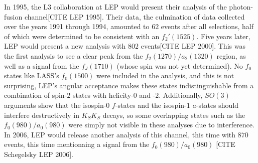 In 1995, the L3 collaboration at LEP would present their analysis of the photon-fusion channel{\color{red}[CITE LEP 1995]}. Their data, the culmination of data collected over the years 1991 through 1994, amounted to $62$ events after all selections, half of which were determined to be consistent with an $f_2'(1525)$. Five years later, LEP would present a new analysis with $802$ events{\color{red}[CITE LEP 2000]}. This was the first analysis to see a clear peak from the $f_2(1270)/a_2(1320)$ region, as well as a signal from the $f_J(1710)$ (whose spin was not yet determined). No $f_0$ states like LASS's $f_0(1500)$ were included in the analysis, and this is not surprising, LEP's angular acceptance makes these states indistinguishable from a combination of spin-$2$ states with helicity-$0$ and -$2$. Additionally, $SO(3)$ arguments show that the isospin-$0$ $f$-states and the isospin-$1$ $a$-states should interfere destructively in $K_SK_S$ decays, so some overlapping states such as the $f_0(980)/a_0(980)$ were simply not visible in these analyses due to interference. In 2006, LEP would release another analysis of this channel, this time with $870$ events, this time mentionaing a signal from the $f_0(980)/a_0(980)$ {\color{red}[CITE Schegelsky LEP 2006]}. 
